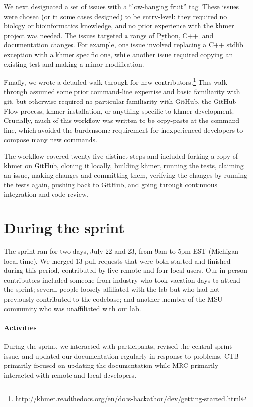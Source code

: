 \documentclass[11pt]{article}
\begin{document}
We next designated a set of issues with a ``low-hanging fruit'' tag.
These issues were chosen (or in some cases designed) to be
entry-level: they required no biology or bioinformatics knowledge, and
no prior experience with the khmer project was needed.  The issues
targeted a range of Python, C++, and documentation changes.  For
example, one issue involved replacing a C++ stdlib exception with a
khmer specific one, while another issue required copying an existing
test and making a minor modification.

Finally, we wrote a detailed walk-through for new
contributors.\footnote{http://khmer.readthedocs.org/en/docs-hackathon/dev/getting-started.html}
This walk-through assumed some prior command-line expertise and basic
familiarity with git, but otherwise required no particular familiarity
with GitHub, the GitHub Flow process, khmer installation, or anything
specific to khmer development.  Crucially, much of this workflow was
written to be copy-paste at the command line, which avoided the
burdensome requirement for inexperienced developers to compose many
new commands.

The workflow covered twenty five distinct steps and included forking a
copy of khmer on GitHub, cloning it locally, building khmer, running
the tests, claiming an issue, making changes and committing them,
verifying the changes by running the tests again, pushing back to
GitHub, and going through continuous integration and code review.

\section{During the sprint}

The sprint ran for two days, July 22 and 23, from 9am to 5pm EST
(Michigan local time).  We merged 13 pull requests that were both
started and finished during this period, contributed by five remote
and four local users.  Our in-person contributors included someone
from industry who took vacation days to attend the sprint; several
people loosely affiliated with the lab but who had not previously
contributed to the codebase; and another member of the MSU community
who was unaffiliated with our lab.

\paragraph{Activities}
During the sprint, we interacted with participants, revised the
central sprint issue, and updated our documentation regularly in
response to problems.  CTB primarily focused on updating the
documentation while MRC primarily interacted with remote and local
developers.
\end{document}
